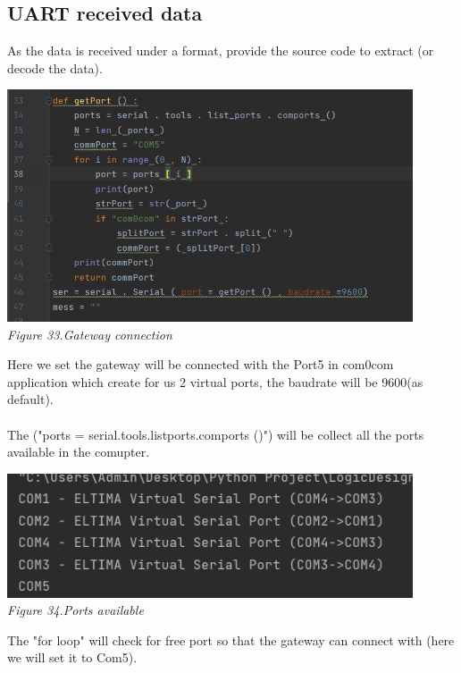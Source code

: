 \documentclass[a4paper]{article}
\begin{document}
\subsection{UART received data}
As the data is received under a format, provide the source code to extract (or decode the data). \\
\begin{center}
    \includegraphics[width=12cm]{pictures/getPort.png}\\
    \textit{Figure 33.Gateway connection}\\
\end{center}
Here we set the gateway will be connected with the Port5 in com0com application which create for us 2 virtual ports, the baudrate will be 9600(as default). \\
\\
The ("ports = serial.tools.listports.comports ()") will be collect all the ports available in the comupter. \\
\begin{center}
    \includegraphics[width=12cm]{pictures/Portavailable.png}\\
    \textit{Figure 34.Ports available}\\
\end{center}
The "for loop" will check for free port so that the gateway can connect with (here we will set it to Com5).\\
\end{document}
